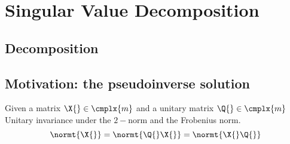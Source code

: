 \section{\label{sec:formulation svd}Singular Value Decomposition}

\subsection{Decomposition}

\subsection{Motivation: the pseudoinverse solution}
Given a matrix $\X{} \in \cmplx{m}$ and a unitary matrix $\Q{}\in \cmplx{m}$
Unitary invariance under the $2-$norm and the Frobenius norm.
  \begin{equation}
      \normt{\X{}} = \normt{\Q{} \X{}} = \normt{\X{}\Q{}}
  \end{equation}

